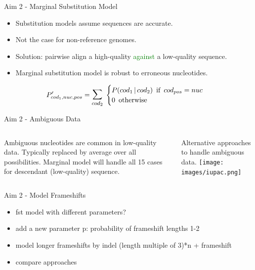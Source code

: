 \documentclass{beamer}
\newcommand{\green}[1]{\textcolor{green}{#1}}
\begin{document}
\begin{frame}{Aim 2 - Marginal Substitution Model} %
\begin{itemize}
	\item Substitution models assume sequences are accurate.
	\item Not the case for non-reference genomes.
	\item Solution: pairwise align a high-quality \green{against} a low-quality sequence.
	\item Marginal substitution model is robust to erroneous nucleotides.
\end{itemize}

\[P'_{cod_1,nuc,pos} = \mathlarger{\mathlarger{\sum}}_{cod_2} \thickspace \begin{cases}
	P(cod_1 \thinspace | \thinspace cod_2) \enspace \text{if} \enspace cod_{pos} = nuc\\
	0 \enspace \text{otherwise}
\end{cases} \]

\end{frame} %

\begin{frame}{Aim 2 - Ambiguous Data} %
\begin{columns}
Ambiguous nucleotides are common in low-quality data.
Typically replaced by average over all possibilities.
Marginal model will handle all 15 cases for descendant (low-quality) sequence.

Alternative approaches to handle ambiguous data.
\texttt{[image: images/iupac.png]}
\end{columns}
\end{frame} %

\begin{frame}{Aim 2 - Model Frameshifts} %
\begin{itemize}
	\item fst model with different parameters?
	\item add a new parameter p: probability of frameshift lengths 1-2
	\item model longer frameshifts by indel (length multiple of 3)*n + frameshift
	\item compare approaches
\end{itemize}
\end{frame} %
\end{document}

